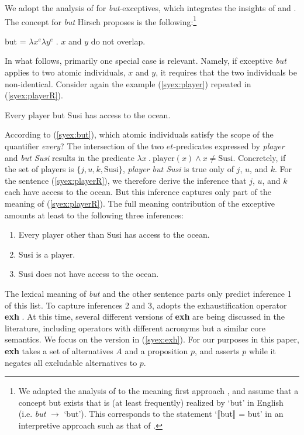 \documentclass[output=paper]{langscibook}
\begin{document}
We adopt the analysis of \citet{hirsch16b} for \emph{but}-exceptives, which integrates the insights of \citet{fintel93} and \citet{gajewski08b}.
The concept for \emph{but} Hirsch proposes is the following:\footnote{We adapted the analysis of \citet{hirsch16b} to the meaning first approach \citep{sauerland20b}, and assume that a concept \textsf{but} exists that is (at least frequently) realized by `but' in English (i.e. \textit{but} $\longrightarrow$ `but').  This corresponds to the statement `⟦but⟧ = \textsf{but}' in an interpretive approach such as that of \citet{heim98}.} 

\ea \label{syex:but}
    \textsf{but} = $\lambda x^e  \lambda y^e$ . $x$ and $y$ do not overlap.\z

In what follows, primarily one special case is relevant. Namely, if exceptive \emph{but} applies to two atomic individuals, $x$ and $y$, it requires that the two individuals be non-identical.  
Consider again the example (\ref{syex:player}) repeated in (\ref{syex:playerR}).

\ea \label{syex:playerR} 
   Every player but Susi has access to the ocean.\z

According to (\ref{syex:but}), which atomic individuals satisfy the scope of the quantifier \emph{every}?
The intersection of the two $et$-predicates expressed by \emph{player} and \emph{but Susi} results in the predicate $\lambda x\ .\ \text{player}(x) \wedge x \neq \text{Susi}$.
Concretely, if the set of players is $\{j, u, k, \text{Susi}\}$, \emph{player but Susi} is true only of $j$, $u$, and $k$.  
For the sentence (\ref{syex:playerR}), we therefore derive the inference that $j$, $u$, and $k$ each have access to the ocean.
But this inference captures only part of the meaning of (\ref{syex:playerR}).
The full meaning contribution of the exceptive amounts at least to the following three inferences:

\ea%
    \begin{enumerate}
    \item Every player other than Susi has access to the ocean.
    \item Susi is a player.
    \item Susi does not have access to the ocean.
    \end{enumerate}\label{syex:inferences}
\z

The lexical meaning of \emph{but} and the other sentence parts only predict inference 1 of this list.
To capture inferences 2 and 3, \citet{hirsch16b} adopts the exhaustification operator \textbf{exh} \citep{chierchia13a,fox07b}.
At this time, several different versions of \textbf{exh} are being discussed in the literature, including operators with different acronyms but a similar core semantics.
We focus on the version in (\ref{syex:exh}). For our purposes in this paper, \textbf{exh} takes a set of alternatives $A$ and a proposition $p$, and asserts $p$ while it negates all excludable alternatives to $p$.
\end{document}
